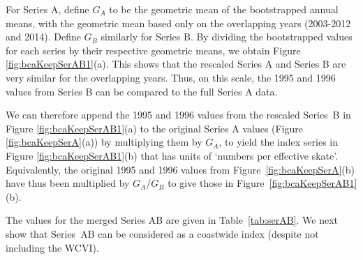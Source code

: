 For Series A, define $G_A$ to be the geometric mean of the bootstrapped annual
means, with the geometric mean based only on the overlapping years (2003-2012
and 2014). Define $G_B$ similarly for Series B. By dividing the bootstrapped
values for each series by their respective geometric means, we obtain Figure
\ref{fig:bcaKeepSerAB1}(a). This shows that the rescaled Series A and Series B
are very similar for the overlapping years. Thus, on this scale, the 1995 and
1996 values from Series B can be compared to the full Series A data.

We can therefore append the 1995 and 1996 values from the rescaled Series~B in
Figure \ref{fig:bcaKeepSerAB1}(a) to the original Series A values (Figure
\ref{fig:bcaKeepSerA}(a)) by multiplying them by $G_A$, to yield the index
series in Figure \ref{fig:bcaKeepSerAB1}(b) that has units of `numbers per
effective skate'. Equivalently, the original 1995 and 1996 values from
Figure~\ref{fig:bcaKeepSerA}(b) have thus been multiplied by $G_A / G_B$ to give
those in Figure~\ref{fig:bcaKeepSerAB1}(b).

The values for the merged Series AB are given in Table~\ref{tab:serAB}. We next show that Series~AB can be considered as a coastwide index (despite not including the WCVI). %


